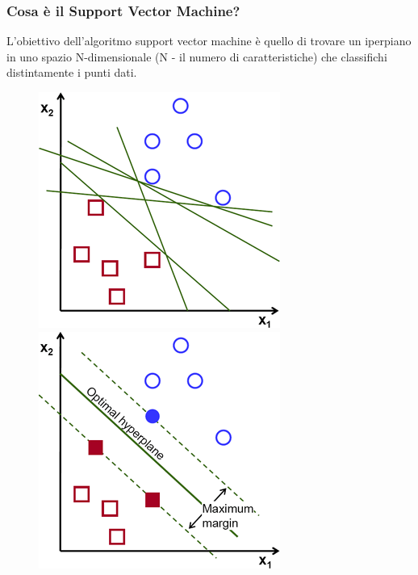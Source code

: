 \subsubsection{Cosa è il Support Vector Machine?}
L'obiettivo dell'algoritmo support vector machine è quello di trovare un iperpiano in uno spazio N-dimensionale (N - il numero di caratteristiche) che classifichi distintamente i punti dati.
\begin{figure}[h]
  \begin{minipage}[b]{0.45\linewidth}
    \centering
    \includegraphics[width=\linewidth]{images/image25.png}
  \end{minipage}
  \begin{minipage}[b]{0.45\linewidth}
    \centering
    \includegraphics[width=\linewidth]{images/image26.png}

\end{minipage}
\end{figure}
